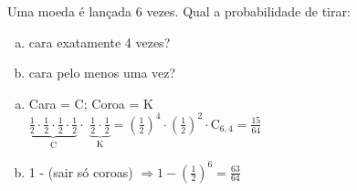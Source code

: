 \begin{ex}
 Uma moeda é lançada 6 vezes. Qual a probabilidade de tirar:
    \begin{enumerate}[(a)]
    \item cara exatamente 4 vezes?
    \item cara pelo menos uma vez?
    \end{enumerate}
      \begin{sol}
          \phantom{A} 
        \begin{enumerate} [(a)]
            \item Cara = C; Coroa = K \\
           $ \underbrace{
           \frac{1}{2}\cdot \frac{1}{2}\cdot \frac{1}{2}\cdot \frac{1}{2}} _\text{C}\cdot$
           $ \underbrace{
           \frac{1}{2}\cdot\frac{1}{2}} _\text{K}=(\frac{1}{2})^4\cdot(\frac{1}{2})^2\cdot \mathrm{C}_{6,4}= \frac{15}{64}$
           \item 1 - (sair só coroas) $\Longrightarrow  1 - (\frac{1}{2})^6 =\frac{63}{64} $
        \end{enumerate}
      \end{sol}
\end{ex}